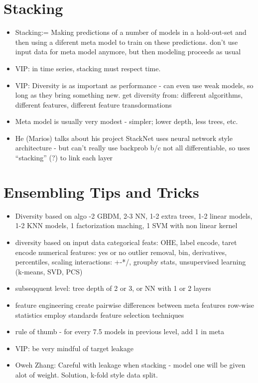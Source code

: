 \documentclass[a4paper]{report}
\begin{document}
\section{Stacking}
\begin{itemize}
  \item Stacking:= Making predictions of a number of models in a hold-out-set and then using a diferent meta model to train on these predictions.
    \subitem don't use input data for meta model anymore, but then modeling proceeds as usual
  \item VIP: in time series, stacking must respect time.
  \item VIP: Diversity is as important as performance - can even use weak models, so long as they bring something new.
    \subitem get diversity from: different algorithms, different features, different feature transdormations
  \item Meta model is usually very modest - simpler; lower depth, less trees, etc.
  \item He (Marios) talks about his project StackNet
    \subitem uses neural network style architecture - but can't really use backprob b/c not all differentiable, so uses ``stacking'' (?) to link each layer
\end{itemize}

\section{Ensembling Tips and Tricks}
\begin{itemize}
  \item Diversity based on algo
    -2 GBDM, 2-3 NN, 1-2 extra trees, 1-2 linear models, 1-2 KNN models, 1 factorization maching, 1 SVM with non linear kernel
  \item diversity based on input data
    \subitem categorical feats: OHE, label encode, taret encode
    \subitem numerical features: yes or no outlier removal, bin, derivatives, percentiles, scaling
    \subitem interactions: +-*/, groupby stats, unsupervised learning (k-means, SVD, PCS) 
  \item subseqquent level: tree depth of 2 or 3, or NN with 1 or 2 layers
  \item feature engineering
    \subitem create pairwise differences between meta features
    \subitem row-wise statistics
    \subitem employ standards feature selection techniques
  \item rule of thumb - for every 7.5 models in previous level, add 1 in meta
  \item VIP: be very mindful of target leakage
  \item Oweh Zhang: Careful with leakage when stacking - model one will be given alot of weight. Solution, k-fold style data split.

\end{itemize}	
\end{document}
